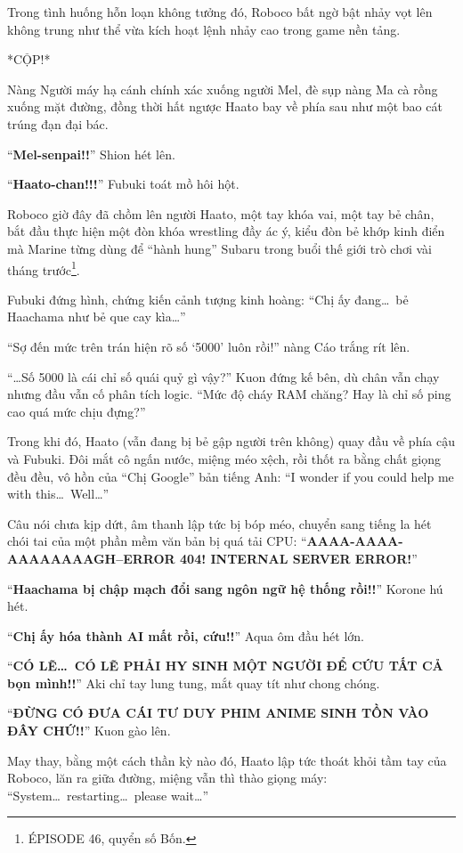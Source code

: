 \documentclass[../main.tex]{subfiles}
\begin{document}
Trong tình huống hỗn loạn không tưởng đó, Roboco bất ngờ bật nhảy vọt lên không trung như thể vừa kích hoạt lệnh nhảy cao trong game nền tảng.

*CỘP!*

Nàng Người máy hạ cánh chính xác xuống người Mel, đè sụp nàng Ma cà rồng xuống mặt đường, đồng thời hất ngược Haato bay về phía sau như một bao cát trúng đạn đại bác.

``\textbf{Mel-senpai!!}'' Shion hét lên.

``\textbf{Haato-chan!!!}'' Fubuki toát mồ hôi hột.

Roboco giờ đây đã chồm lên người Haato, một tay khóa vai, một tay bẻ chân, bắt đầu thực hiện một đòn khóa wrestling đầy ác ý, kiểu đòn bẻ khớp kinh điển mà Marine từng dùng để ``hành hung'' Subaru trong buổi thế giới trò chơi vài tháng trước\footnote{{\flaregothic ÉPISODE 46}, quyển số Bốn.}.

Fubuki đứng hình, chứng kiến cảnh tượng kinh hoàng: ``Chị ấy đang\dots\ bẻ Haachama như bẻ que cay kìa\dots''

``Sợ đến mức trên trán hiện rõ số `5000' luôn rồi!'' nàng Cáo trắng rít lên.


``\dots Số 5000 là cái chỉ số quái quỷ gì vậy?'' Kuon đứng kế bên, dù chân vẫn chạy nhưng đầu vẫn cố phân tích logic. ``Mức độ cháy RAM chăng? Hay là chỉ số ping cao quá mức chịu đựng?''

Trong khi đó, Haato (vẫn đang bị bẻ gập người trên không) quay đầu về phía cậu và Fubuki. Đôi mắt cô ngấn nước, miệng méo xệch, rồi thốt ra bằng chất giọng đều đều, vô hồn của ``Chị Google'' bản tiếng Anh: ``I wonder if you could help me with this\dots\ Well\dots''

Câu nói chưa kịp dứt, âm thanh lập tức bị bóp méo, chuyển sang tiếng la hét chói tai của một phần mềm văn bản bị quá tải CPU: ``\textbf{AAAA-AAAA-AAAAAAAAGH--ERROR 404! INTERNAL SERVER ERROR!}''

``\textbf{Haachama bị chập mạch đổi sang ngôn ngữ hệ thống rồi!!}'' Korone hú hét.

``\textbf{Chị ấy hóa thành AI mất rồi, cứu!!}'' Aqua ôm đầu hét lớn.

``\textbf{CÓ LẼ\dots\ CÓ LẼ PHẢI HY SINH MỘT NGƯỜI ĐỂ CỨU TẤT CẢ bọn mình!!}'' Aki chỉ tay lung tung, mắt quay tít như chong chóng.

``\textbf{ĐỪNG CÓ ĐƯA CÁI TƯ DUY PHIM ANIME SINH TỒN VÀO ĐÂY CHỨ!!}'' Kuon gào lên.

May thay, bằng một cách thần kỳ nào đó, Haato lập tức thoát khỏi tầm tay của Roboco, lăn ra giữa đường, miệng vẫn thì thào giọng máy: ``System\dots\ restarting\dots\ please wait\dots''
\end{document}
